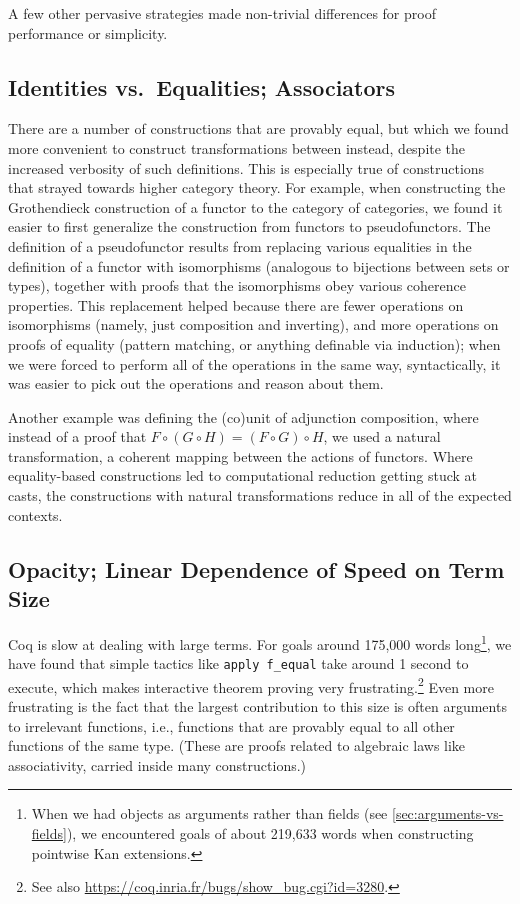 A few other pervasive strategies made non-trivial differences for proof performance or simplicity.

  \subsection{Identities vs.~Equalities; Associators} \label{sec:associators}
    There are a number of constructions that are provably equal, but which we found more convenient to construct transformations between instead, despite the increased verbosity of such definitions.
    This is especially true of constructions that strayed towards higher category theory.
    For example, when constructing the Grothendieck construction of a functor to the category of categories, we found it easier to first generalize the construction from functors to pseudofunctors.
    The definition of a pseudofunctor results from replacing various equalities in the definition of a functor with isomorphisms (analogous to bijections between sets or types), together with proofs that the isomorphisms obey various coherence properties.
    This replacement helped because there are fewer operations on isomorphisms (namely, just composition and inverting), and more operations on proofs of equality (pattern matching, or anything definable via induction); when we were forced to perform all of the operations in the same way, syntactically, it was easier to pick out the operations and reason about them.

    Another example was defining the (co)unit of adjunction composition, where instead of a proof that $F \circ (G \circ H) = (F \circ G) \circ H$, we used a natural transformation, a coherent mapping between the actions of functors.
    Where equality-based constructions led to computational reduction getting stuck at casts, the constructions with natural transformations reduce in all of the expected contexts.

  \subsection{Opacity; Linear Dependence of Speed on Term Size}\label{sec:equality-reflection}\label{sec:term-size}

    Coq is slow at dealing with large terms.
    For goals around 175,000 words long\footnote{When we had objects as arguments rather than fields (see \autoref{sec:arguments-vs-fields}), we encountered goals of about 219,633 words when constructing pointwise Kan extensions.}, we have found that simple tactics like \texttt{apply f\_equal} take around 1 second to execute, which makes interactive theorem proving very frustrating.\footnote{See also \url{https://coq.inria.fr/bugs/show\_bug.cgi?id=3280}.}
    Even more frustrating is the fact that the largest contribution to this size is often arguments to irrelevant functions, i.e., functions that are provably equal to all other functions of the same type.
    (These are proofs related to algebraic laws like associativity, carried inside many constructions.)

